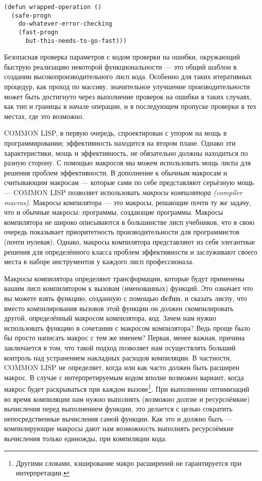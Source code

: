 \begin{verbatim}
(defun wrapped-operation ()
  (safe-progn
    do-whatever-error-checking
    (fast-progn
      but-this-needs-to-go-fast)))
\end{verbatim}

Безопасная проверка параметров с кодом проверки на ошибки, окружающий быструю реализацию некоторой функциональности --- это общий шаблон в создании высокопроизводительного лисп кода. Особенно для таких итеративных процедур, как проход по массиву, значительное улучшение производительности может быть достигнуто через выполнение проверок на ошибки в таких случаях, как тип и границы в начале операции, и в последующем пропуске проверки в тех местах, где это возможно.

COMMON LISP, в первую очередь, спроектирован с упором на мощь в программировании; эффективность находится на втором плане. Однако эти характеристики, мощь и эффективность, не обязательно должны находиться по разную сторону. С помощью макросов мы можем использовать мощь лиспа для решения проблем эффективности. В дополнение к обычным макросам и считывающим макросам --- которые сами по себе представляют серьёзную мощь --- COMMON LISP позволяет использовать \emph{макросы компилятора (compiler macros)}. Макросы компилятора --- это макросы, решающие почти ту же задачу, что и обычные макросы: программы, создающие программы. Макросы компилятора не широко описываются в большинстве лисп учебников, что в свою очередь показывает приоритетность производительности для программистов (почти нулевая). Однако, макросы компилятора представляют из себя элегантные решения для определённого класса проблем эффективности и заслуживают своего места в наборе инструментов у каждого лисп профессионала.

Макросы компилятора определяют трансформации, которые будут применены вашим лисп компилятором к вызовам (именованных) функций. Это означает что вы можете взять функцию, созданную с помощью \textbf{defun}, и сказать лиспу, что вместо компилирования вызовов этой функции он должен скомпилировать другой, определённый макросом компилятора, код. Зачем нам нужно использовать функцию в сочетании с макросом компилятора? Ведь проще было бы просто написать макрос с тем же именем? Первая, менее важная, причина заключается в том, что такой подход позволяет нам осуществлять больший контроль над устранением накладных расходов компиляции. В частности, COMMON LISP не определяет, когда или как часто должен быть расширен макрос. В случае с интерпретируемым кодом вполне возможен вариант, когда макрос будет раскрываться при каждом вызове\footnote{Другими словами, кэширование макро расширений не гарантируется при интерпретации.}. При выполнении оптимизаций во время компиляции нам нужно выполнять (возможно долгие и ресурсоёмкие) вычисления перед выполнением функции, это делается с целью сократить непосредственные вычисления самой функции. Как это и должно быть --- компилирующие макросы дают нам возможность выполнять ресурсоёмкие вычисления только единожды, при компиляции кода.

